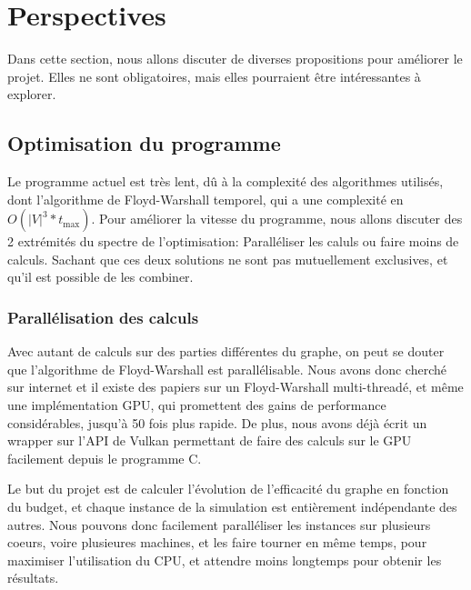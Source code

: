 \section{Perspectives}\label{sec:perspectives}
Dans cette section, nous allons discuter de diverses propositions pour améliorer le projet.
Elles ne sont obligatoires, mais elles pourraient être intéressantes à explorer.

\subsection{Optimisation du programme}\label{subsec:optimisation_du_programme}

Le programme actuel est très lent, dû à la complexité des algorithmes utilisés, dont l'algorithme de Floyd-Warshall temporel, qui a une complexité en $O(|V|^3*t_{\max})$.
Pour améliorer la vitesse du programme, nous allons discuter des 2 extrémités du spectre de l'optimisation: Paralléliser les caluls ou faire moins de calculs.
Sachant que ces deux solutions ne sont pas mutuellement exclusives, et qu'il est possible de les combiner.

\subsubsection{Parallélisation des calculs}\label{subsubsec:parallelisation}

\label{subsubsubsec:parallelisation_algorithme}
Avec autant de calculs sur des parties différentes du graphe, on peut se douter que l'algorithme de Floyd-Warshall est parallélisable.
Nous avons donc cherché sur internet et il existe des papiers sur un Floyd-Warshall multi-threadé\cite{Multithread_FW}, et même une implémentation GPU\cite{GPU_FW}, qui promettent des gains de performance considérables, jusqu'à 50 fois plus rapide.
De plus, nous avons déjà écrit un wrapper sur l'API de Vulkan permettant de faire des calculs sur le GPU facilement depuis le programme C.

\label{subsubsubsec:parallelisation_simulations} 
Le but du projet est de calculer l'évolution de l'efficacité du graphe en fonction du budget, et chaque instance de la simulation est entièrement indépendante des autres.
Nous pouvons donc facilement paralléliser les instances sur plusieurs coeurs, voire plusieures machines, et les faire tourner en même temps, pour maximiser l'utilisation du CPU, et attendre moins longtemps pour obtenir les résultats.

